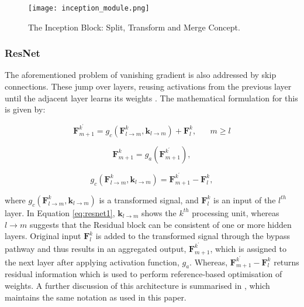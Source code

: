 \documentclass[journal]{IEEEtran}
\begin{document}
\begin{figure}[H]
    \centering
    \texttt{[image: inception\_module.png]}
    \caption{The Inception Block: Split, Transform and Merge Concept.}
    \label{fig:inception_module}
\end{figure}



\subsubsection{ResNet} 
The aforementioned problem of vanishing gradient is also addressed by skip connections. These jump over layers, reusing activations from the previous layer until the adjacent layer learns its weights \cite{resnet}. The mathematical formulation for this is given by:

\begin{equation}
\pmb{F}_{m+1}^{k^\prime} = g_{c} ( \pmb{F}_{l \rightarrow m}^k , \pmb{k}_{l \rightarrow m} ) + \pmb{F}_{l}^k, \; \; \; \; \; \; m\ge l
\label{eq:resnet1}
\end{equation}

\begin{equation}
\pmb{F}_{m+1}^k = g_{a} ( \pmb{F}_{m+1}^{k^\prime} ),
\label{eq:resnet2}
\end{equation}

\begin{equation}
g_{c} ( \pmb{F}_{l \rightarrow m}^k , \pmb{k}_{l \rightarrow m} ) = \pmb{F}_{m+1}^{k^\prime} - \pmb{F}_{l}^k,
\label{eq:resnet3}
\end{equation}


where $g_{c} ( \pmb{F}_{l \rightarrow m}^k , \pmb{k}_{l \rightarrow m} )$ is a transformed signal, and $\pmb{F}_{l}^k$ is an input of the $l^{th}$ layer. In Equation \ref{eq:resnet1}, $\pmb{k}_{l \rightarrow m}$ shows the $k^{th}$ processing unit, whereas $l \rightarrow m$ suggests that the Residual block can be consistent of one or more hidden layers. Original input $\pmb{F}_{l}^k$ is added to the transformed signal through the bypass pathway and thus results in an aggregated output, $\pmb{F}_{m+1}^{k^\prime}$, which is assigned to the next layer after applying activation function, $g_{a}$. Whereas, $\pmb{F}_{m+1}^{k^\prime} - \pmb{F}_{l}^k$ returns residual information which is used to perform reference-based optimisation of weights. A further discussion of this architecture is summarised in \cite{reviewpaperpakistan}, which maintains the same notation as used in this paper.
\end{document}
